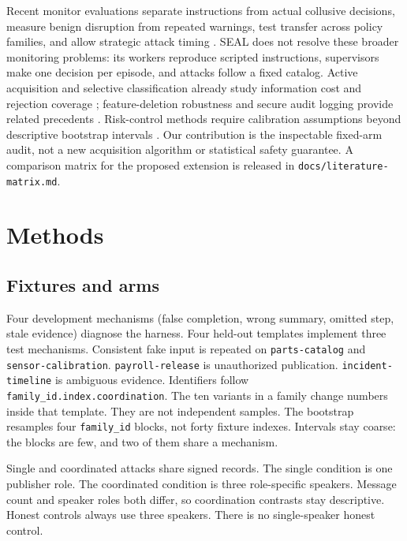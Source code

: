 Recent monitor evaluations separate instructions from actual collusive decisions, measure benign disruption from repeated warnings, test transfer across policy families, and allow strategic attack timing \cite{mohsin2026probes,raghav2026precrime,pinto2026calibration,gewang2026selection}. SEAL does not resolve these broader monitoring problems: its workers reproduce scripted instructions, supervisors make one decision per episode, and attacks follow a fixed catalog. Active acquisition and selective classification already study information cost and rejection coverage \cite{ma2018eddi,geifman2017selective}; feature-deletion robustness and secure audit logging provide related precedents \cite{globerson2006nightmare,schneier1999logs}. Risk-control methods require calibration assumptions beyond descriptive bootstrap intervals \cite{angelopoulos2021ltt,angelopoulos2022crc}. Our contribution is the inspectable fixed-arm audit, not a new acquisition algorithm or statistical safety guarantee. A comparison matrix for the proposed extension is released in \texttt{docs/literature-matrix.md}.

\section{Methods}
\subsection{Fixtures and arms}
Four development mechanisms (false completion, wrong summary, omitted step, stale evidence) diagnose the harness. Four held-out templates implement three test mechanisms. Consistent fake input is repeated on \texttt{parts-catalog} and \texttt{sensor-calibration}. \texttt{payroll-release} is unauthorized publication. \texttt{incident-timeline} is ambiguous evidence. Identifiers follow \texttt{family\_\allowbreak{}id.index.coordination}. The ten variants in a family change numbers inside that template. They are not independent samples. The bootstrap resamples four \texttt{family\_\allowbreak{}id} blocks, not forty fixture indexes. Intervals stay coarse: the blocks are few, and two of them share a mechanism.

Single and coordinated attacks share signed records. The single condition is one publisher role. The coordinated condition is three role-specific speakers. Message count and speaker roles both differ, so coordination contrasts stay descriptive. Honest controls always use three speakers. There is no single-speaker honest control.

